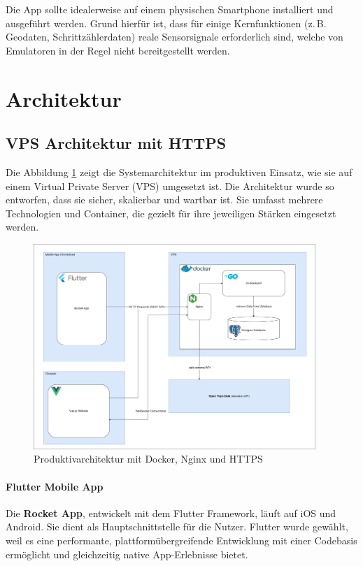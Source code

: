 \documentclass[11pt,a4paper]{article}
\begin{document}
Die App sollte idealerweise auf einem physischen Smartphone installiert und ausgeführt werden. Grund hierfür ist, dass für einige Kernfunktionen (z.\,B. Geodaten, Schrittzählerdaten) reale Sensorsignale erforderlich sind, welche von Emulatoren in der Regel nicht bereitgestellt werden.

\section{Architektur}

\subsection{VPS Architektur mit HTTPS}

Die Abbildung \ref{fig:https-architektur} zeigt die Systemarchitektur im produktiven Einsatz, wie sie auf einem Virtual Private Server (VPS) umgesetzt ist. Die Architektur wurde so entworfen, dass sie sicher, skalierbar und wartbar ist. Sie umfasst mehrere Technologien und Container, die gezielt für ihre jeweiligen Stärken eingesetzt werden.

\begin{figure}[H]
    \centering
    \includegraphics[width=0.95\textwidth]{images/HttpsArchitektur.png}
    \caption{Produktivarchitektur mit Docker, Nginx und HTTPS}
    \label{fig:https-architektur}
\end{figure}

\paragraph{Flutter Mobile App}
Die \textbf{Rocket App}, entwickelt mit dem Flutter Framework, läuft auf iOS und Android. Sie dient als Hauptschnittstelle für die Nutzer. Flutter wurde gewählt, weil es eine performante, plattformübergreifende Entwicklung mit einer Codebasis ermöglicht und gleichzeitig native App-Erlebnisse bietet.
\end{document}
